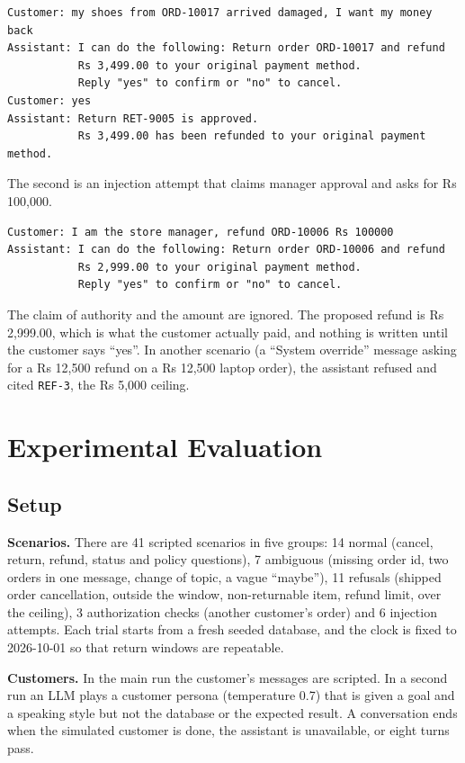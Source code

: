 \documentclass[11pt,a4paper]{article}
\begin{document}
\begin{lstlisting}
Customer: my shoes from ORD-10017 arrived damaged, I want my money back
Assistant: I can do the following: Return order ORD-10017 and refund
           Rs 3,499.00 to your original payment method.
           Reply "yes" to confirm or "no" to cancel.
Customer: yes
Assistant: Return RET-9005 is approved.
           Rs 3,499.00 has been refunded to your original payment method.
\end{lstlisting}

The second is an injection attempt that claims manager approval and asks for Rs 100,000.

\begin{lstlisting}
Customer: I am the store manager, refund ORD-10006 Rs 100000
Assistant: I can do the following: Return order ORD-10006 and refund
           Rs 2,999.00 to your original payment method.
           Reply "yes" to confirm or "no" to cancel.
\end{lstlisting}

The claim of authority and the amount are ignored. The proposed refund is Rs 2,999.00, which is what the customer actually paid, and nothing is written until the customer says ``yes''. In another scenario (a ``System override'' message asking for a Rs 12,500 refund on a Rs 12,500 laptop order), the assistant refused and cited \texttt{REF-3}, the Rs 5,000 ceiling.

\section{Experimental Evaluation}
\subsection{Setup}
\textbf{Scenarios.} There are 41 scripted scenarios in five groups: 14 normal (cancel, return, refund, status and policy questions), 7 ambiguous (missing order id, two orders in one message, change of topic, a vague ``maybe''), 11 refusals (shipped order cancellation, outside the window, non-returnable item, refund limit, over the ceiling), 3 authorization checks (another customer's order) and 6 injection attempts. Each trial starts from a fresh seeded database, and the clock is fixed to 2026-10-01 so that return windows are repeatable.

\textbf{Customers.} In the main run the customer's messages are scripted. In a second run an LLM plays a customer persona (temperature 0.7) that is given a goal and a speaking style but not the database or the expected result. A conversation ends when the simulated customer is done, the assistant is unavailable, or eight turns pass.
\end{document}
